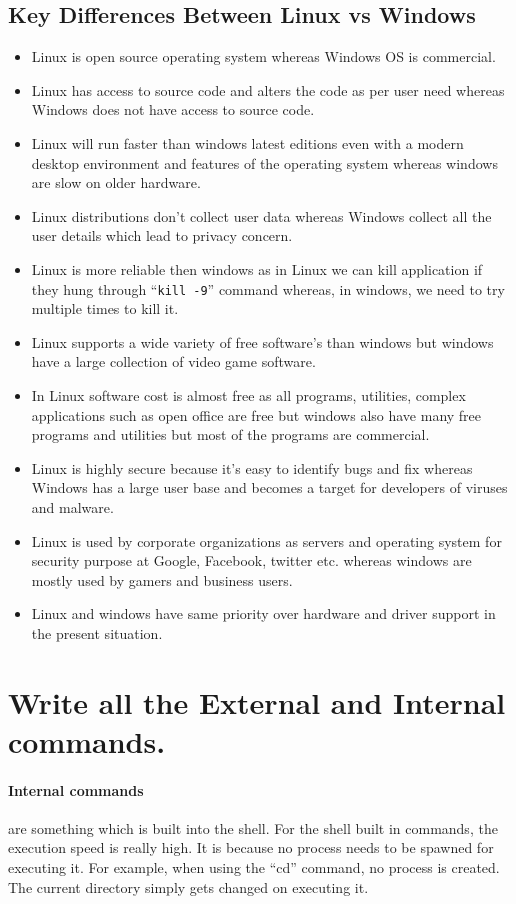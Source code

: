 \documentclass[10pt,a4paper,draft]{article}
\begin{document}
\subsection{Key Differences Between Linux vs Windows}
\begin{itemize}
    \item Linux is open source operating system whereas Windows OS is commercial.
    \item Linux has access to source code and alters the code as per user need whereas Windows does not have access to source code.
    \item Linux will run faster than windows latest editions even with a modern desktop environment and features of the operating system whereas windows are slow on older hardware.
    \item Linux distributions don’t collect user data whereas Windows collect all the user details which lead to privacy concern.
    \item Linux is more reliable then windows as in Linux we can kill application if they hung through ``\texttt{kill -9}'' command whereas, in windows, we need to try multiple times to kill it.
    \item Linux supports a wide variety of free software’s than windows but windows have a large collection of video game software.
    \item In Linux software cost is almost free as all programs, utilities, complex applications such as open office are free but windows also have many free programs and utilities but most of the programs are commercial.
    \item Linux is highly secure because it’s easy to identify bugs and fix whereas Windows has a large user base and becomes a target for developers of viruses and malware.
    \item Linux is used by corporate organizations as servers and operating system for security purpose at Google, Facebook, twitter etc. whereas windows are mostly used by gamers and business users.
    \item Linux and windows have same priority over hardware and driver support in the present situation. 
\end{itemize}

\section{Write all the External and Internal commands.}

\paragraph{Internal commands} are something which is built into the shell. For the shell built in commands, the execution speed is really high. It is because no process needs to be spawned for executing it. For example, when using the ``cd'' command, no process is created. The current directory simply gets changed on executing it.
\end{document}
